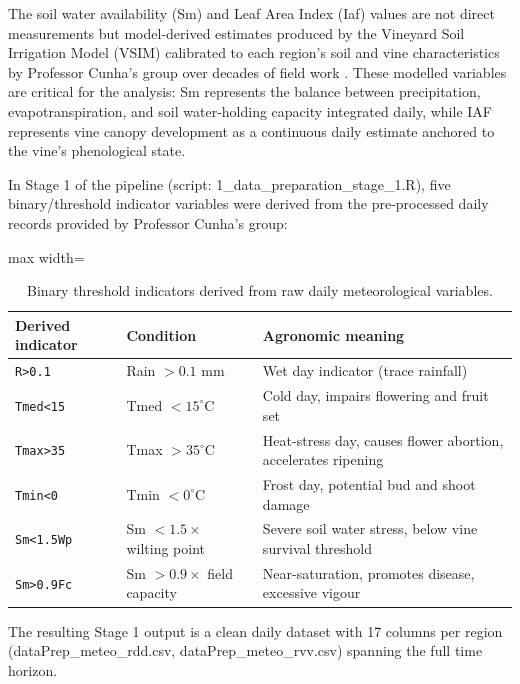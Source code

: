 The soil water availability (Sm) and Leaf Area Index (Iaf) values are not direct measurements but model-derived estimates produced by the Vineyard Soil Irrigation Model (VSIM) calibrated to each region's soil and vine characteristics by Professor Cunha's group over decades of field work \citep{Cunha2016}. These modelled variables are critical for the analysis: Sm represents the balance between precipitation, evapotranspiration, and soil water-holding capacity integrated daily, while IAF represents vine canopy development as a continuous daily estimate anchored to the vine's phenological state.

In Stage 1 of the pipeline (script: 1\_data\_preparation\_stage\_1.R), five binary/threshold indicator variables were derived from the pre-processed daily records provided by Professor Cunha's group:

\begin{table}[htbp]
  \centering
  \caption{Binary threshold indicators derived from raw daily meteorological variables.}\label{tab:ch3d_2}
  \small
  \begin{adjustbox}{max width=\textwidth}
    \begin{tabularx}{\textwidth}{p{3cm} p{3.5cm} X}
    \toprule
    \textbf{Derived indicator} & \textbf{Condition} & \textbf{Agronomic meaning} \\
    \midrule
    \texttt{R>0.1}    & Rain $> 0.1$ mm                       & Wet day indicator (trace rainfall) \\
    \texttt{Tmed<15}  & Tmed $< 15^\circ$C                    & Cold day, impairs flowering and fruit set \\
    \texttt{Tmax>35}  & Tmax $> 35^\circ$C                    & Heat-stress day, causes flower abortion, accelerates ripening \\
    \texttt{Tmin<0}   & Tmin $< 0^\circ$C                     & Frost day, potential bud and shoot damage \\
    \texttt{Sm<1.5Wp} & Sm $< 1.5 \times$ wilting point       & Severe soil water stress, below vine survival threshold \\
    \texttt{Sm>0.9Fc} & Sm $> 0.9 \times$ field capacity      & Near-saturation, promotes disease, excessive vigour \\
    \bottomrule
  \end{tabularx}
  \end{adjustbox}

\end{table}


The resulting Stage 1 output is a clean daily dataset with 17 columns per region (dataPrep\_meteo\_rdd.csv, dataPrep\_meteo\_rvv.csv) spanning the full time horizon.


